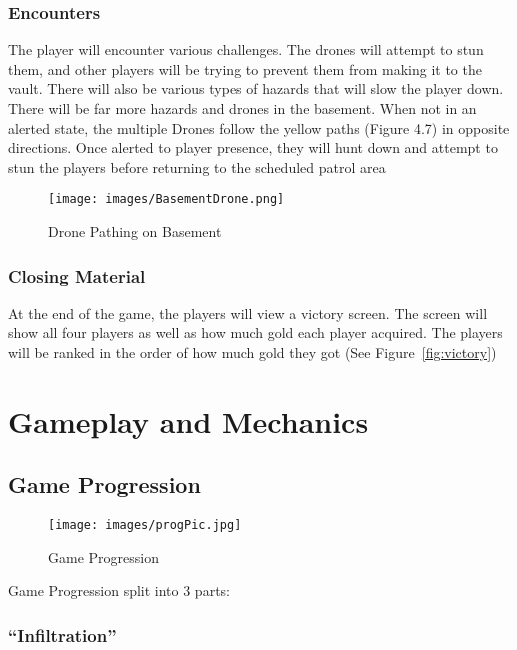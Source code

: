 \documentclass[10pt]{report}
\begin{document}
\subsection{Encounters}

The player will encounter various challenges. The drones will attempt to stun them, and other players will be trying to prevent them from making it to the vault. There will also be various types of hazards that will slow the player down. There will be far more hazards and drones in the basement. When not in an alerted state, the multiple Drones follow the yellow paths (Figure 4.7) in opposite directions. Once alerted to player presence, they will hunt down and attempt to stun the players before returning to the scheduled patrol area

\begin{figure}[H]
    \centering
    \texttt{[image: images/BasementDrone.png]}
    \caption{Drone Pathing on Basement}
\end{figure}

\subsection{Closing Material}

At the end of the game, the players will view a victory screen. The screen will show all four players as well as how much gold each player acquired. The players will be ranked in the order of how much gold they got (See Figure~\ref{fig:victory})

\chapter{Gameplay and Mechanics}

\section{Game Progression}

\begin{figure}[H]
    \centering
    \texttt{[image: images/progPic.jpg]}
    \caption{Game Progression}
\end{figure}

Game Progression split into 3 parts:

\subsection{``Infiltration''}
\end{document}
